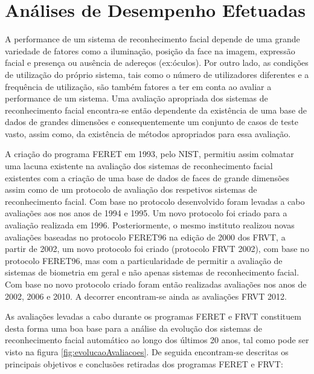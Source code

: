 \section{Análises de Desempenho Efetuadas}\label{sec:performance}
A performance de um sistema de reconhecimento facial depende de uma grande variedade de fatores como a iluminação, posição da face na imagem, expressão facial e presença ou ausência de adereços (ex:óculos). Por outro lado, as condições de utilização do próprio sistema, tais como o número de utilizadores diferentes e a frequência de utilização, são também fatores a ter em conta ao avaliar a performance de um sistema. Uma avaliação apropriada dos sistemas de reconhecimento facial encontra-se então dependente da existência de uma base de dados de grandes dimensões e consequentemente um conjunto de casos de teste vasto, assim como, da existência de métodos apropriados para essa avaliação.

A criação do programa FERET em 1993, pelo NIST, permitiu assim colmatar uma lacuna existente na avaliação dos sistemas de reconhecimento facial existentes com a criação de uma base de dados de faces de grande dimensões assim como de um protocolo de avaliação dos respetivos sistemas de reconhecimento facial. Com base no protocolo desenvolvido foram levadas a cabo avaliações aos nos anos de 1994 e 1995. Um novo protocolo foi criado para a avaliação realizada em 1996. Posteriormente, o mesmo instituto realizou novas avaliações baseadas no protocolo FERET96 na edição de 2000 dos FRVT, a partir de 2002, um novo protocolo foi criado (protocolo FRVT 2002), com base no protocolo FERET96, mas com a particularidade de permitir a avaliação de sistemas de biometria em geral e não apenas sistemas de reconhecimento facial. Com base no novo protocolo criado foram então realizadas avaliações nos anos de 2002, 2006 e 2010. A decorrer encontram-se ainda as avaliações FRVT 2012. 

As avaliações levadas a cabo durante os programas FERET e FRVT constituem desta forma uma boa base para a análise da evolução dos sistemas de reconhecimento facial automático ao longo dos últimos 20 anos, tal como pode ser visto na figura \ref{fig:evolucaoAvaliacoes}. De seguida encontram-se descritas os principais objetivos e conclusões retiradas dos programas FERET e FRVT:

